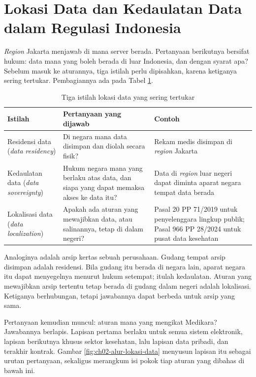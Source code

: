 \section{Lokasi Data dan Kedaulatan Data dalam Regulasi Indonesia}

\textit{Region} Jakarta menjawab di mana server berada. Pertanyaan berikutnya bersifat
hukum: data mana yang boleh berada di luar Indonesia, dan dengan syarat apa? Sebelum masuk
ke aturannya, tiga istilah perlu dipisahkan, karena ketiganya sering tertukar.
Pembagiannya ada pada Tabel \ref{tab:ch02-istilah-lokasi}.

\begin{table}[!htb]
  \centering
  \caption{Tiga istilah lokasi data yang sering tertukar}
  \label{tab:ch02-istilah-lokasi}
  \small
  \begin{tabularx}{\textwidth}{>{\raggedright\arraybackslash}p{2.9cm}
      >{\raggedright\arraybackslash}X >{\raggedright\arraybackslash}X}
    \hline
    \textbf{Istilah} & \textbf{Pertanyaan yang dijawab} & \textbf{Contoh} \\
    \hline
    Residensi data (\textit{data residency}) & Di negara mana data disimpan dan diolah
      secara fisik? & Rekam medis disimpan di \textit{region} Jakarta \\
    \hline
    Kedaulatan data (\textit{data sovereignty}) & Hukum negara mana yang berlaku atas data,
      dan siapa yang dapat memaksa akses ke data itu? & Data di \textit{region} luar negeri
      dapat diminta aparat negara tempat data berada \\
    \hline
    Lokalisasi data (\textit{data localization}) & Apakah ada aturan yang mewajibkan data,
      atau salinannya, tetap di dalam negeri? & Pasal 20 PP 71/2019 untuk penyelenggara
      lingkup publik; Pasal 966 PP 28/2024 untuk pusat data kesehatan \\
    \hline
  \end{tabularx}
\end{table}

Analoginya adalah arsip kertas sebuah perusahaan. Gudang tempat arsip disimpan adalah
residensi. Bila gudang itu berada di negara lain, aparat negara itu dapat menyegelnya
menurut hukum setempat; itulah kedaulatan. Aturan yang mewajibkan arsip tertentu tetap
berada di gudang dalam negeri adalah lokalisasi. Ketiganya berhubungan, tetapi jawabannya
dapat berbeda untuk arsip yang sama.

Pertanyaan kemudian muncul: aturan mana yang mengikat Medikara? Jawabannya berlapis.
Lapisan pertama berlaku untuk semua sistem elektronik, lapisan berikutnya khusus sektor
kesehatan, lalu lapisan data pribadi, dan terakhir kontrak. Gambar
\ref{fig:ch02-alur-lokasi-data} menyusun lapisan itu sebagai urutan pertanyaan, sekaligus
merangkum isi pokok tiap aturan yang dibahas di bawah ini.

